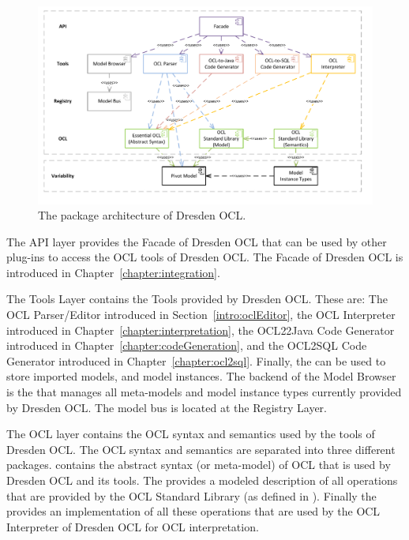 \begin{figure}[!b]
	\centering
	\includegraphics[width=1.0\linewidth]{figures/architecture/modules}
	\caption{The package architecture of Dresden OCL.}
	\label{pic:architecture:modules}
\end{figure}

The API layer provides the Facade of Dresden OCL that can be used by other
plug-ins to access the \acs{OCL} tools of Dresden OCL. The Facade of Dresden OCL
is introduced in Chapter~\ref{chapter:integration}.

The Tools Layer contains the Tools provided by Dresden OCL. These are: The
\acs{OCL} Parser/Editor introduced in Section~\ref{intro:oclEditor}, the
\acs{OCL} Interpreter introduced in Chapter~\ref{chapter:interpretation}, the
\acs{OCL}22Java Code Generator introduced in
Chapter~\ref{chapter:codeGeneration}, and the
\acs{OCL}2SQL Code Generator introduced in
Chapter~\ref{chapter:ocl2sql}. Finally, the 
can be used to store imported models, and model instances. The backend of the Model
Browser is the  that manages all meta-models and model
instance types currently provided by Dresden OCL. The model bus is located at the
Registry Layer.

The \acs{OCL} layer contains the \acs{OCL} syntax and semantics used by the
tools of Dresden OCL. The \acs{OCL} syntax and semantics are separated into
three different packages.  contains the abstract syntax
(or meta-model) of \acs{OCL} that is used by Dresden OCL and its tools. The
 provides a modeled description of all
operations that are provided by the \acs{OCL} Standard Library (as defined in
\cite[Ch.~11]{spec:OCL2-3}). Finally the  provides an implementation of all these operations that are used by
the \acs{OCL} Interpreter of Dresden OCL for \acs{OCL} interpretation.

